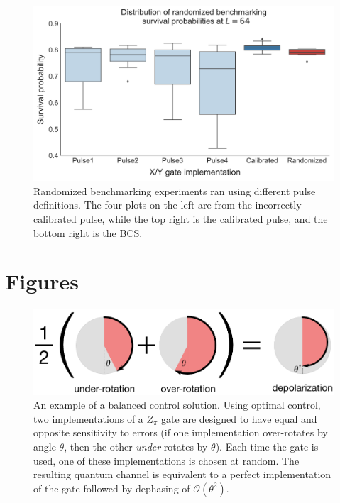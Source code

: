 \documentclass[aps,nofootinbib,pra,notitlepage,twocolumn]{revtex4-1}
\newcommand{\order}[1]{\mathcal{O}\left( #1 \right)}
\begin{document}
\begin{figure}
  \centering
  \includegraphics[width=\columnwidth]{rb_data.pdf}
  \caption{Randomized benchmarking experiments ran using different pulse definitions. The four plots on the left are from the incorrectly calibrated pulse, while the top right is the calibrated pulse, and the bottom right is the BCS.}
  \label{fig:rb}
\end{figure}




\section{Figures}
\label{sec:figures}

\begin{figure}
  \centering
  \includegraphics[width=\columnwidth]{simple_example.pdf}
  \caption{An example of a balanced control solution. Using optimal control, two implementations of a $Z_\pi$ gate are designed to have equal and opposite sensitivity to errors (if one implementation over-rotates by angle $\theta$, then the other \emph{under}-rotates by $\theta$). Each time the gate is used, one of these implementations is chosen at random. The resulting quantum channel is equivalent to a perfect implementation of the gate followed by dephasing of $\order{\theta^2}$.}
  \label{fig:simple_example}
\end{figure}
\end{document}
